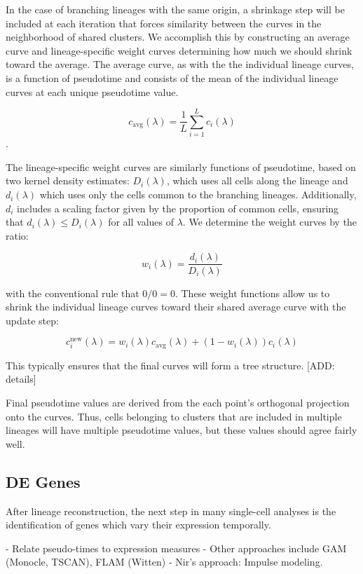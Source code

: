 \documentclass[11pt]{article}\usepackage[]{graphicx}\usepackage[]{color}
\begin{document}
In the case of branching lineages with the same origin, a shrinkage step will be included at each iteration that forces similarity between the curves in the neighborhood of shared clusters. We accomplish this by constructing an average curve and lineage-specific weight curves determining how much we should shrink toward the average. The average curve, as with the the individual lineage curves, is a function of pseudotime and consists of the mean of the individual lineage curves at each unique pseudotime value.

$$c_{\text{avg}}(\lambda) = \frac{1}{L}\sum_{i=1}^{L}{c_i(\lambda)}$$.

The lineage-specific weight curves are similarly functions of pseudotime, based on two kernel density estimates: $D_i(\lambda)$, which uses all cells along the lineage and $d_i(\lambda)$ which uses only the cells common to the branching lineages. Additionally, $d_i$ includes a scaling factor given by the proportion of common cells, ensuring that $d_i(\lambda) \leq D_i(\lambda)$ for all values of $\lambda$. We determine the weight curves by the ratio:

$$w_i(\lambda) = \frac{d_i(\lambda)}{D_i(\lambda)}$$

with the conventional rule that $0/0 = 0$. These weight functions allow us to shrink the individual lineage curves toward their shared average curve with the update step:

$$c_i^\text{new}(\lambda) = w_i(\lambda)c_{\text{avg}}(\lambda) + (1-w_i(\lambda))c_i(\lambda)$$



This typically ensures that the final curves will form a tree structure. [ADD: details]

Final pseudotime values are derived from the each point’s orthogonal projection onto the curves. Thus, cells belonging to clusters that are included in multiple lineages will have multiple pseudotime values, but these values should agree fairly well.


\subsection{DE Genes}
After lineage reconstruction, the next step in many single-cell analyses is the identification of genes which vary their expression temporally. 

- Relate pseudo-times to expression measures
- Other approaches include GAM (Monocle, TSCAN), FLAM (Witten)
- Nir's approach: Impulse modeling. 
\end{document}
